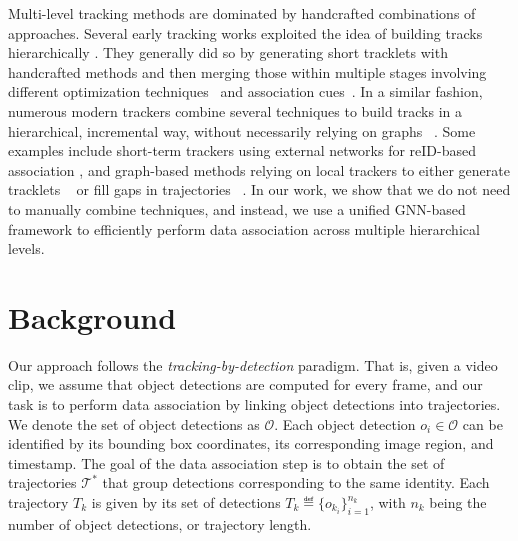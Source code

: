 \documentclass[10pt,twocolumn,letterpaper]{article}
\begin{document}
{{ Multi-level tracking methods are dominated by handcrafted combinations of approaches. Several early tracking works exploited the idea of building tracks hierarchically  \cite{hierarchical_first, multi_view_hierarchical, hierarchical_hypergraph, net_flows_stitching}. They generally did so by generating short tracklets with handcrafted methods and then merging those within multiple stages involving different optimization techniques~\cite{hierarchical_hypergraph,multi_view_hierarchical,net_flows_stitching} and association cues~\cite{hierarchical_first}.  In a similar fashion, numerous modern trackers combine several techniques to build tracks in a hierarchical, incremental way, without necessarily relying on graphs ~\cite{tracktor, trackformer, mpntrack, lpc, lift, aplift, associating_clips}. Some examples include short-term trackers using external networks for reID-based association \cite{deepsort, tracktor, trackformer}, and graph-based methods relying on local trackers to either generate tracklets ~\cite{mpntrack} or fill gaps in trajectories ~\cite{aplift, lift}. In our work, we show that we do not need to manually combine techniques, and instead, we use a unified GNN-based framework to efficiently perform data association across multiple hierarchical levels. 



 


\section{Background} \label{background}
 Our approach follows the \textit{tracking-by-detection} paradigm. That is, given a video clip, we assume that object detections are computed for every frame, and our task is to perform data association by linking object detections into trajectories.
We denote the set of object detections as $\mathcal{O}$. Each object detection $o_i\in \mathcal{O}$ can be identified by its bounding box coordinates, its corresponding image region, and timestamp. The goal of the data association step is to obtain the set of trajectories $\mathcal{T}^*$ that group detections corresponding to the same identity. Each trajectory $T_k$ is given by its set of detections $T_k\eqdef\{o_{k_i}\}_{i=1}^{n_{k}}$, with $n_k$ being the number of object detections, or trajectory length. 

}}
\end{document}
